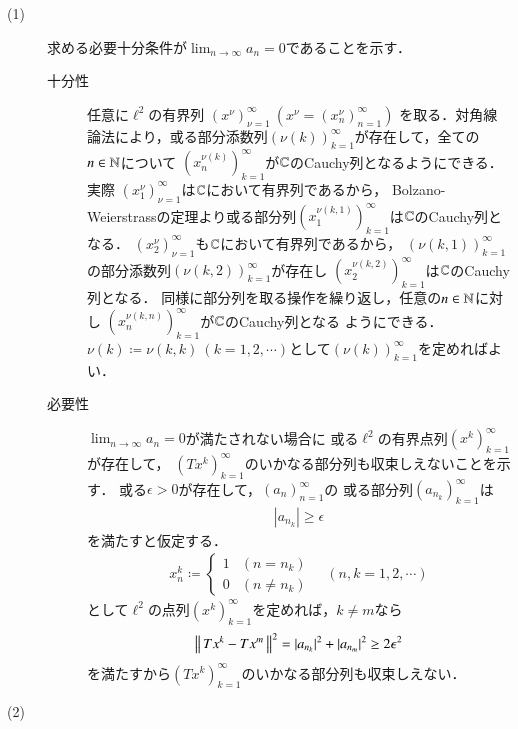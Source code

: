 	\begin{prf}\mbox{}
		\begin{description}
			\item[(1)] 求める必要十分条件が$\lim_{n \to \infty} a_n = 0$であることを示す．
				\begin{description}
					\item[十分性] 任意に$\ell^2$の有界列
						$\left( x^{\nu} \right)_{\nu=1}^{\infty}\ \left(x^{\nu} = \left( x^{\nu}_n \right)_{n=1}^{\infty} \right)$
						を取る．対角線論法により，或る部分添数列$(\nu(k))_{k=1}^{\infty}$が存在して，全ての$n \in \mathbb{N}$について
						$\left(x_n^{\nu(k)} \right)_{k=1}^{\infty}$が$\mathbb{C}$のCauchy列となるようにできる．実際
						$\left( x^{\nu}_1 \right)_{\nu=1}^{\infty}$は$\mathbb{C}$において有界列であるから，
						Bolzano-Weierstrassの定理より或る部分列$\left( x^{\nu(k,1)}_1 \right)_{k=1}^{\infty}$は$\mathbb{C}$のCauchy列となる．
						$\left( x^{\nu}_2 \right)_{\nu=1}^{\infty}$も$\mathbb{C}$において有界列であるから，
						$(\nu(k,1))_{k=1}^{\infty}$の部分添数列$(\nu(k,2))_{k=1}^{\infty}$が存在し
						$\left( x^{\nu(k,2)}_2 \right)_{k=1}^{\infty}$は$\mathbb{C}$のCauchy列となる．
						同様に部分列を取る操作を繰り返し，任意の$n \in \mathbb{N}$に対し
						$\left( x^{\nu(k,n)}_n \right)_{k=1}^{\infty}$が$\mathbb{C}$のCauchy列となる
						ようにできる．$\nu(k) \coloneqq \nu(k,k)\ (k=1,2,\cdots)$として$(\nu(k))_{k=1}^{\infty}$を定めればよい．
						
						
					\item[必要性]
						$\lim_{n \to \infty} a_n = 0$が満たされない場合に
						或る$\ell^2$の有界点列$(x^k)_{k=1}^{\infty}$が存在して，
						$(T x^k)_{k=1}^{\infty}$のいかなる部分列も収束しえないことを示す．
						或る$\epsilon > 0$が存在して，$(a_n)_{n=1}^{\infty}$の
						或る部分列$\left(a_{n_k}\right)_{k=1}^{\infty}$は
						\begin{align}
							\left| a_{n_k} \right| \geq \epsilon
						\end{align}
						を満たすと仮定する．
						\begin{align}
							x^k_n \coloneqq
							\begin{cases}
								1 & (n=n_k) \\
								0 & (n \neq n_k)
							\end{cases}
							\quad (n,k=1,2,\cdots)
						\end{align}
						として$\ell^2$の点列$(x^k)_{k=1}^{\infty}$を定めれば，$k \neq m$なら
						\begin{align}
							\left\|\, T x^k - T x^m\, \right\|_{}^2
							= |a_{n_k}|^2 + |a_{n_m}|^2
							\geq 2 \epsilon^2
						\end{align}
						を満たすから$(T x^k)_{k=1}^{\infty}$のいかなる部分列も収束しえない．
				\end{description}
			\item[(2)]
		\end{description}
	\end{prf}
	
